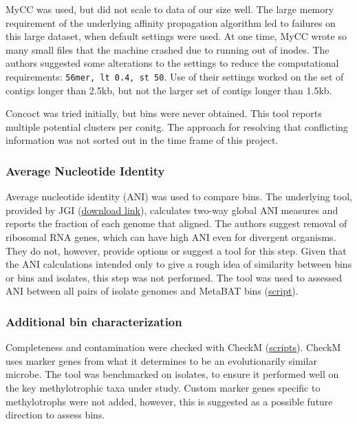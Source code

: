 MyCC was used, but did not scale to data of our size well.
The large memory requirement of the underlying affinity propagation algorithm led to failures on this large dataset, when default settings were used.
At one time, MyCC wrote so many small files that the machine crashed due to running out of inodes.
The authors suggested some alterations to the settings to reduce the computational requirements:  \texttt{56mer, lt 0.4, st 50}.
Use of their settings worked on the set of contigs longer than 2.5kb, but not the larger set of contigs longer than 1.5kb.

Concoct was tried initially, but bins were never obtained.
This tool reports multiple potential clusters per conitg.
The approach for resolving that conflicting information was not sorted out in the time frame of this project.

\subsubsection{Average Nucleotide Identity}
Average nucleotide identity (ANI) was used to compare bins.
The underlying tool, provided by JGI  \cite{varghese2015} (\href{https://ani.jgi-psf.org/html/anicalculator.php}{download link}), calculates two-way global ANI measures and reports the fraction of each genome that aligned.
The authors suggest removal of ribosomal RNA genes, which can have high ANI even for divergent organisms.
They do not, however, provide options or suggest a tool for this step.
Given that the ANI calculations intended only to give a rough idea of similarity between bins or bins and isolates, this step was not performed.
The tool was used to assessed ANI between all pairs of isolate genomes and MetaBAT bins (\href{https://github.com/BeckResearchLab/meta4/blob/master/m4b_binning/assembly/ANI/ANIs_of_all_combos.py}{script}).

\subsubsection{Additional bin characterization}

Completeness and contamination were checked with CheckM \cite{parks2015} (\href{https://github.com/BeckResearchLab/meta4/tree/master/m4b_binning/assembly/bin_info}{scripts}).
CheckM uses marker genes from what it determines to be an evolutionarily similar microbe.
The tool was benchmarked on isolates, to ensure it performed well on the key methylotrophic taxa under study.
Custom marker genes specific to methylotrophs were not added, however, this is suggested as a possible future direction to assess bins.


